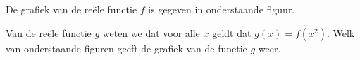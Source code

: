 \documentclass{ximera}
\begin{document}
\newpage
\begin{oefening2}

De grafiek van de re\"ele functie $f$ is gegeven in onderstaande figuur.

Van de re\"ele functie $g$ weten we dat voor alle $x$ geldt dat $g(x)=f(x^2)$. Welk van onderstaande figuren geeft de grafiek van de functie $g$ weer.

\end{oefening2}
\end{document}
